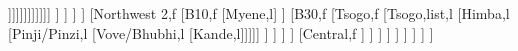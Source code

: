 \documentclass[landscape]{standalone}
\begin{document}
\begin{forest}
													[Samay,l
													[Ndambomo,l
													[Metombola,u]]]]]]]]]]]]
												]%
											]%
										]%
									]%
									[Northwest 2,f
										[B10,f
											[Myene,l]
										]%
										[B30,f
											[Tsogo,f
												[Tsogo,list,l
												[Himba,l
												[Pinji/Pinzi,l
												[Vove/Bhubhi,l
												[Kande,l]]]]]
											]%
										]%
									]%
								]%
								[Central,f
								]%
							]%
						]%
					]%
				]%
			]%
		]%
	]%
]%
\end{forest}
\end{document}
